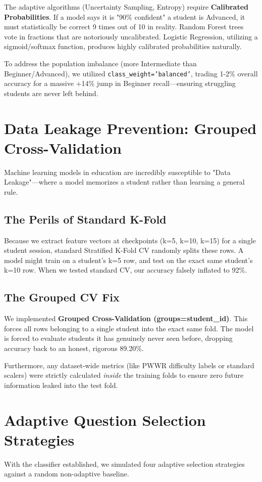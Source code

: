 \documentclass[11pt,a4paper]{article}
\begin{document}
The adaptive algorithms (Uncertainty Sampling, Entropy) require \textbf{Calibrated Probabilities}. If a model says it is "90\% confident" a student is Advanced, it must statistically be correct 9 times out of 10 in reality. Random Forest trees vote in fractions that are notoriously uncalibrated. Logistic Regression, utilizing a sigmoid/softmax function, produces highly calibrated probabilities naturally. 

To address the population imbalance (more Intermediate than Beginner/Advanced), we utilized \texttt{class\_weight='balanced'}, trading 1-2\% overall accuracy for a massive +14\% jump in Beginner recall—ensuring struggling students are never left behind.

\section{Data Leakage Prevention: Grouped Cross-Validation}
Machine learning models in education are incredibly susceptible to "Data Leakage"—where a model memorizes a student rather than learning a general rule.

\subsection{The Perils of Standard K-Fold}
Because we extract feature vectors at checkpoints (k=5, k=10, k=15) for a single student session, standard Stratified K-Fold CV randomly splits these rows. A model might train on a student's k=5 row, and test on the exact same student's k=10 row. 
When we tested standard CV, our accuracy falsely inflated to 92\%. 

\subsection{The Grouped CV Fix}
We implemented \textbf{Grouped Cross-Validation (groups=student\_id)}. This forces all rows belonging to a single student into the exact same fold. The model is forced to evaluate students it has genuinely never seen before, dropping accuracy back to an honest, rigorous 89.20\%.

Furthermore, any dataset-wide metrics (like PWWR difficulty labels or standard scalers) were strictly calculated \textit{inside} the training folds to ensure zero future information leaked into the test fold.

\section{Adaptive Question Selection Strategies}
With the classifier established, we simulated four adaptive selection strategies against a random non-adaptive baseline.
\end{document}
